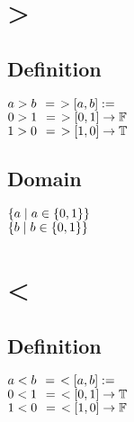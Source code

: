 \documentclass[11pt]{article}
\begin{document}
\section{>}
\subsection{Definition}
\begin{center}
$
a > b \hspace{1.5mm} =\hspace{1.5mm} >[a,b] :=
$
\\ \vspace{2mm}
$
0 > 1\hspace{1.5mm} =\hspace{1.5mm} >[0,1] \rightarrow \mathbb{F} 
$
\\ \vspace{2mm}
$
1 > 0 \hspace{1.5mm}=\hspace{1.5mm} >[1,0] \rightarrow \mathbb{T} 
$
\end{center}
\subsection{Domain}
\begin{center}
$
\{ a \hspace{1mm}| \hspace{1mm} a \in \{0,1\} \}
$
\\ \vspace{2mm}
$
\{ b \hspace{1mm}| \hspace{1mm} b \in \{0,1\} \}
$
\end{center}




\newpage
\section{<}
\subsection{Definition}
\begin{center}
$
a < b \hspace{1.5mm} =\hspace{1.5mm} <[a,b] :=
$
\\ \vspace{2mm}
$
0 < 1\hspace{1.5mm} =\hspace{1.5mm} <[0,1] \rightarrow \mathbb{T} 
$
\\ \vspace{2mm}
$
1 < 0 \hspace{1.5mm}=\hspace{1.5mm} <[1,0] \rightarrow \mathbb{F} 
$
\end{center}
\end{document}

